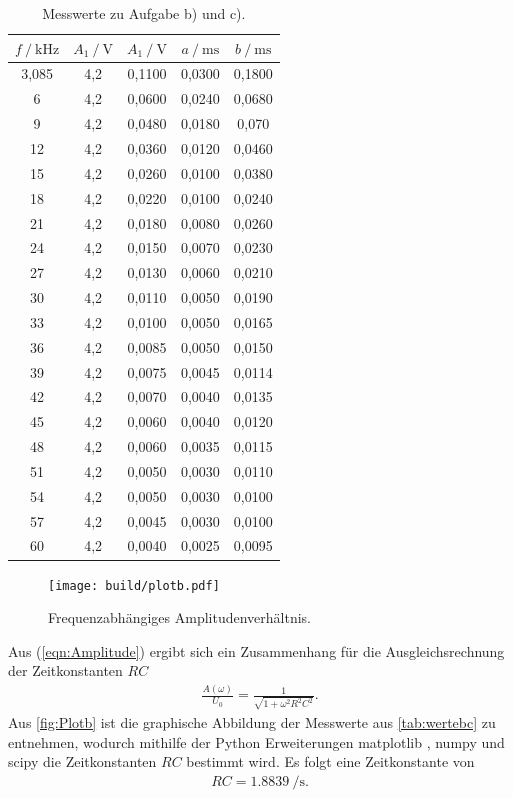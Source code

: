 \begin{table}[H]
    \centering
    \caption{Messwerte zu Aufgabe b) und c).}
    \label{tab:wertebc}
    \begin{tabular}{c c c c c}
        \toprule
        $f \:/\:\si{\kilo\hertz}$ & $A_1 \:/\: \si{\volt}$ & $A_1 \:/\: \si{\volt}$ & $a \:/\: \si{\milli\second}$ & $b \:/\: \si{\milli\second}$ \\
        \midrule
        3,085 & 4,2 & 0,1100 & 0,0300 & 0,1800 \\
        6 & 4,2 & 0,0600 & 0,0240 & 0,0680 \\
        9 & 4,2 & 0,0480 & 0,0180 & 0,070 \\
        12 & 4,2 & 0,0360 & 0,0120 & 0,0460 \\
        15 & 4,2 & 0,0260 & 0,0100 & 0,0380 \\
        18 & 4,2 & 0,0220 & 0,0100 & 0,0240 \\
        21 & 4,2 & 0,0180 & 0,0080 & 0,0260 \\
        24 & 4,2 & 0,0150 & 0,0070 & 0,0230 \\
        27 & 4,2 & 0,0130 & 0,0060 & 0,0210 \\
        30 & 4,2 & 0,0110 & 0,0050 & 0,0190 \\
        33 & 4,2 & 0,0100 & 0,0050 & 0,0165 \\
        36 & 4,2 & 0,0085 & 0,0050 & 0,0150 \\
        39 & 4,2 & 0,0075 & 0,0045 & 0,0114 \\
        42 & 4,2 & 0,0070 & 0,0040 & 0,0135 \\
        45 & 4,2 & 0,0060 & 0,0040 & 0,0120 \\
        48 & 4,2 & 0,0060 & 0,0035 & 0,0115 \\
        51 & 4,2 & 0,0050 & 0,0030 & 0,0110 \\
        54 & 4,2 & 0,0050 & 0,0030 & 0,0100 \\
        57 & 4,2 & 0,0045 & 0,0030 & 0,0100 \\
        60 & 4,2 & 0,0040 & 0,0025 & 0,0095 \\
        \bottomrule
    \end{tabular}
\end{table}


\begin{figure}[H]
    \centering
    \texttt{[image: build/plotb.pdf]}
    \caption{Frequenzabhängiges Amplitudenverhältnis.}
    \label{fig:Plotb}
\end{figure}
Aus (\ref{eqn:Amplitude}) ergibt sich ein Zusammenhang für die Ausgleichsrechnung der Zeitkonstanten $RC$
\begin{align}
    \frac{A(\omega)}{U_0} = \frac{1}{\sqrt{1+\omega^2R^2C^2}}.
    \label{eqn:ausgl}
\end{align}
Aus \autoref{fig:Plotb} ist die graphische Abbildung der Messwerte aus \autoref{tab:wertebc} zu entnehmen, wodurch mithilfe der Python
Erweiterungen matplotlib \cite{matplotlib}, numpy \cite{numpy} und scipy \cite{scipy} die Zeitkonstanten $RC$ bestimmt wird.
Es folgt eine Zeitkonstante von
\begin{align*}
    RC = \SI{1.8839}{\per\second}.
\end{align*}

